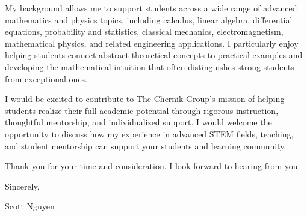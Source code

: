 \documentclass[11pt]{article}
\begin{document}
	My background allows me to support students across a wide range of advanced mathematics and physics topics, including calculus, linear algebra, differential equations, probability and statistics, classical mechanics, electromagnetism, mathematical physics, and related engineering applications. I particularly enjoy helping students connect abstract theoretical concepts to practical examples and developing the mathematical intuition that often distinguishes strong students from exceptional ones.
	
	I would be excited to contribute to The Chernik Group's mission of helping students realize their full academic potential through rigorous instruction, thoughtful mentorship, and individualized support. I would welcome the opportunity to discuss how my experience in advanced STEM fields, teaching, and student mentorship can support your students and learning community.
	
	Thank you for your time and consideration. I look forward to hearing from you.
	
	Sincerely,
	
	\vspace{0.2in}
	
	Scott Nguyen
	
\end{document}
